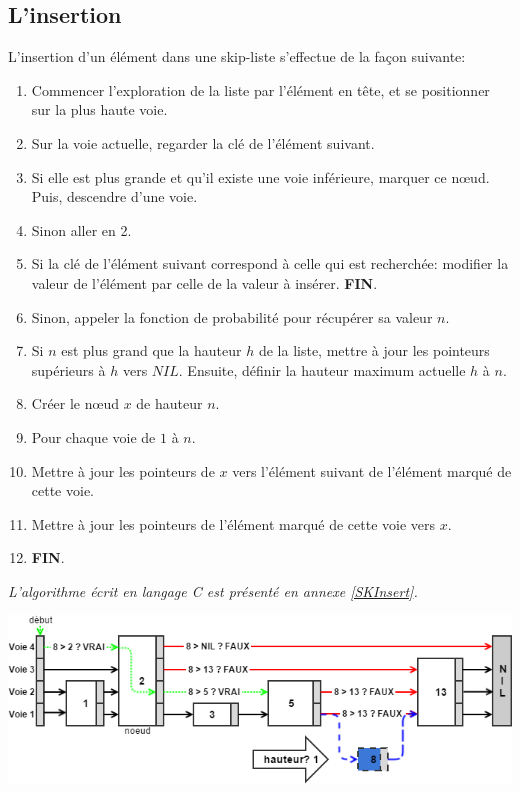 \documentclass[hidelinks,a4paper, 12pt]{article}
\begin{document}
	\subsection{L'insertion}
	L'insertion d'un élément dans une skip-liste s'effectue de la façon suivante:
	\begin{enumerate}
		\item Commencer l'exploration de la liste par l'élément en tête, et se positionner sur la plus haute voie.
		\item Sur la voie actuelle, regarder la clé de l'élément suivant.
		\item Si elle est plus grande et qu'il existe une voie inférieure, marquer ce nœud. Puis, descendre d'une voie.
		\item Sinon aller en 2.
		\item Si la clé de l'élément suivant correspond à celle qui est recherchée: modifier la valeur de l'élément par celle de la valeur à insérer. \textbf{FIN}.
		\item Sinon, appeler la fonction de probabilité pour récupérer sa valeur $n$.
		\item Si $n$ est plus grand que la hauteur $h$ de la liste, mettre à jour les pointeurs supérieurs à $h$ vers $NIL$. Ensuite, définir la hauteur maximum actuelle $h$ à $n$.
		\item Créer le nœud $x$ de hauteur $n$.
		\item Pour chaque voie de $1$ à $n$.
		\item Mettre à jour les pointeurs de $x$ vers l'élément suivant de l'élément marqué de cette voie.
		\item Mettre à jour les pointeurs de l'élément marqué de cette voie vers $x$.
		\item \textbf{FIN}.
	\end{enumerate}
	\emph{L'algorithme écrit en langage C est présenté en annexe \ref{SKInsert}.}
	\begin{center}
		\includegraphics[width=\textwidth]{img/insert}
	\end{center}
	
\end{document}
